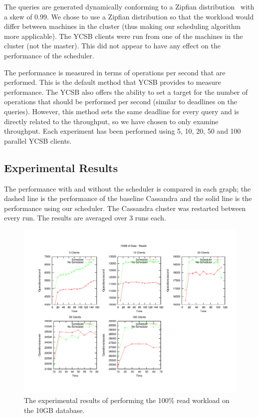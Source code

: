 \documentclass[]{acm_proc_article-sp}
\begin{document}
The queries are generated dynamically conforming to a Zipfian distribution~\cite{Quckly Generating Billion-Record Synthetic Databases} with a skew of 0.99. We chose to use a Zipfian distribution so that the workload would differ between machines in the cluster (thus making our scheduling algorithm more applicable). The YCSB clients were run from one of the machines in the cluster (not the master). This did not appear to have any effect on the performance of the scheduler. 

The performance is measured in terms of operations per second that are performed. This is the default method that YCSB provides to measure performance. The YCSB also offers the ability to set a target for the number of operations that should be performed per second (similar to deadlines on the queries). However, this method sets the same deadline for every query and is directly related to the throughput, so we have chosen to only examine throughput. Each experiment has been performed using 5, 10, 20, 50 and 100 parallel YCSB clients.

\subsection{Experimental Results}
The performance with and without the scheduler is compared in each graph; the dashed line is the performance of the baseline Cassandra and the solid line is the performance using our scheduler. The Cassandra cluster was restarted between every run. The results are averaged over 3 runs each.

\begin{figure}[t]
\centering
\includegraphics[scale=0.5]{images/10GB_Reads.pdf}
\vspace{-15pt}
\caption{The experimental results of performing the 100\% read workload on the 10GB database.}
\label{fig:10g_reads}
\end{figure}
\end{document}
